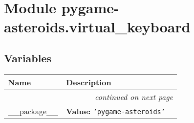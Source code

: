 %
%
%


\section{Module pygame-asteroids.virtual\_keyboard}

    \label{pygame-asteroids:virtual_keyboard}


  \subsection{Variables}

    \vspace{-1cm}
\hspace{\varindent}\begin{longtable}{|p{\varnamewidth}|p{\vardescrwidth}|l}
\cline{1-2}
\cline{1-2} \centering \textbf{Name} & \centering \textbf{Description}& \\
\cline{1-2}
\endhead\cline{1-2}\multicolumn{3}{r}{\small\textit{continued on next page}}\\\endfoot\cline{1-2}
\endlastfoot\raggedright \_\-\_\-p\-a\-c\-k\-a\-g\-e\-\_\-\_\- & \raggedright \textbf{Value:} 
{\tt \texttt{'}\texttt{pygame-asteroids}\texttt{'}}&\\
\cline{1-2}
\end{longtable}



